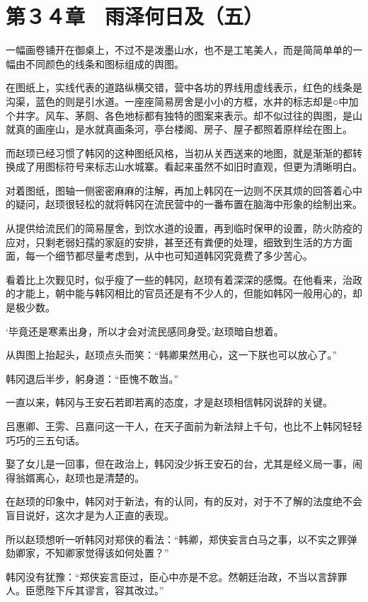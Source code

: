 \section{第３４章　雨泽何日及（五）}

一幅画卷铺开在御桌上，不过不是泼墨山水，也不是工笔美人，而是简简单单的一幅由不同颜色的线条和图标组成的舆图。

在图纸上，实线代表的道路纵横交错，营中各坊的界线用虚线表示，红色的线条是沟渠，蓝色的则是引水道。一座座简易房舍是小小的方框，水井的标志却是○中加个井字。风车、茅厕、各色地标都有独特的图案来表示。却不似过往的舆图，是山就真的画座山，是水就真画条河，亭台楼阁、房子、屋子都照着原样绘在图上。

而赵顼已经习惯了韩冈的这种图纸风格，当初从关西送来的地图，就是渐渐的都转换成了用图标符号来标志山水城寨。看起来虽然不如旧时直观，但更为清晰明白。

对着图纸，图轴一侧密密麻麻的注解，再加上韩冈在一边则不厌其烦的回答着心中的疑问，赵顼很轻松的就将韩冈在流民营中的一番布置在脑海中形象的绘制出来。

从提供给流民们的简易屋舍，到饮水道的设置，再到临时保甲的设置，防火防疫的应对，只剩老弱妇孺的家庭的安排，甚至还有粪便的处理，细致到生活的方方面面，每一个细节都尽量考虑到，从中也可知道韩冈究竟费了多少苦心。

看着比上次觐见时，似乎瘦了一些的韩冈，赵顼有着深深的感慨。在他看来，治政的才能上，朝中能与韩冈相比的官员还是有不少人的，但能如韩冈一般用心的，却是极少数。

‘毕竟还是寒素出身，所以才会对流民感同身受。’赵顼暗自想着。

从舆图上抬起头，赵顼点头而笑：“韩卿果然用心，这一下朕也可以放心了。”

韩冈退后半步，躬身道：“臣愧不敢当。”

一直以来，韩冈与王安石若即若离的态度，才是赵顼相信韩冈说辞的关键。

吕惠卿、王雱、吕嘉问这一干人，在天子面前为新法辩上千句，也比不上韩冈轻轻巧巧的三五句话。

娶了女儿是一回事，但在政治上，韩冈没少拆王安石的台，尤其是经义局一事，闹得翁婿离心，赵顼也是清楚的。

在赵顼的印象中，韩冈对于新法，有的认同，有的反对，对于不了解的法度绝不会盲目说好，这次才是为人正直的表现。

所以赵顼想听一听韩冈对郑侠的看法：“韩卿，郑侠妄言白马之事，以不实之罪弹劾卿家，不知卿家觉得该如何处置？”

韩冈没有犹豫：“郑侠妄言臣过，臣心中亦是不忿。然朝廷治政，不当以言辞罪人。臣愿陛下斥其谬言，容其改过。”

